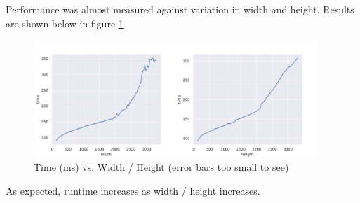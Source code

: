 \documentclass{article}
\begin{document}
Performance was almost measured against variation in width and height.
Results are shown below in figure \ref{fig:graph}

\begin{figure}[H]
  \begin{center}
    \includegraphics[width=0.95\textwidth]{figures/graph.png}
  \end{center}
  \caption{Time (ms) vs. Width / Height (error bars too small to see)}
  \label{fig:graph}
\end{figure}

As expected, runtime increases as width / height increases.
\clearpage
\end{document}
